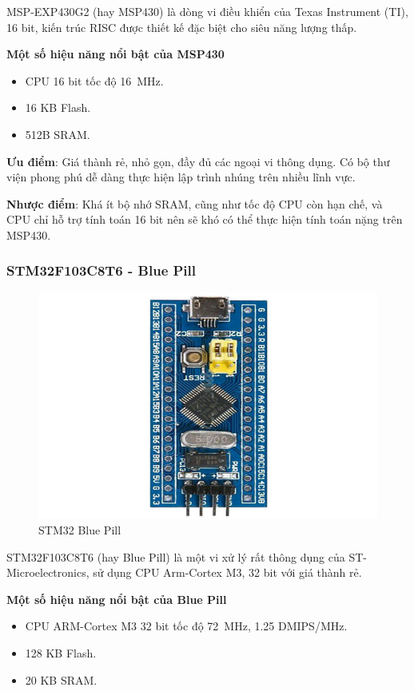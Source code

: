 MSP-EXP430G2 \cite{msp430_datasheet} (hay MSP430) là dòng vi điều khiển của Texas Instrument (TI), 16 bit, kiến trúc RISC được thiết kế đặc biệt cho siêu năng lượng thấp.

\textbf{Một số hiệu năng nổi bật của MSP430}
\begin{itemize}
    \item CPU 16 bit tốc độ \si{16\MHz}.
    \item 16 KB Flash.
    \item 512B SRAM.
\end{itemize}

\textbf{Ưu điểm}: Giá thành rẻ, nhỏ gọn, đầy đủ các ngoại vi thông dụng. Có bộ thư viện phong phú dễ dàng thực hiện lập trình nhúng trên nhiều lĩnh vực.

\textbf{Nhược điểm}: Khá ít bộ nhớ SRAM, cũng như tốc độ CPU còn hạn chế, và CPU chỉ hỗ trợ tính toán 16 bit nên sẽ khó có thể thực hiện tính toán nặng trên MSP430.

\subsubsection{STM32F103C8T6 - Blue Pill}
\begin{figure}[ht]
\centering
\includegraphics[scale=0.35]{images/STM32-Blue-Pill-Development-Board.jpg}
\caption{STM32 Blue Pill}
\end{figure}
STM32F103C8T6 \cite{blue_pill_datasheet} (hay Blue Pill) là một vi xử lý rất thông dụng của ST-Microelectronics, sử dụng CPU Arm-Cortex M3, 32 bit với giá thành rẻ.

\textbf{Một số hiệu năng nổi bật của Blue Pill}
\begin{itemize}
    \item CPU ARM-Cortex M3 32 bit tốc độ \si{72\MHz}, 1.25 DMIPS/MHz.
    \item 128 KB Flash.
    \item 20 KB SRAM.
\end{itemize}

